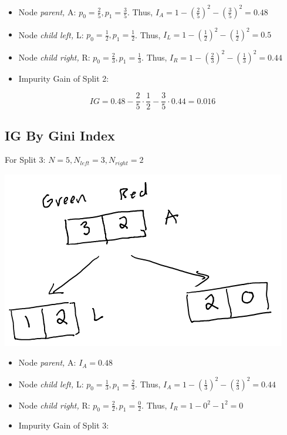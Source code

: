 \documentclass[
]{article}
\begin{document}
\begin{itemize}
\item
  Node \emph{parent,} A: \(p_0 = \frac{2}{5}, p_1 = \frac{3}{5}\). Thus,
  \(I_{A} = 1-(\frac{2}{5})^2- (\frac{3}{5})^2 = 0.48\)
\item
  Node \emph{child left,} L: \(p_0 = \frac{1}{2}, p_1 = \frac{1}{2}\).
  Thus, \(I_{L} = 1- (\frac{1}{2})^2-(\frac{1}{2})^2=0.5\)
\item
  Node \emph{child right,} R: \(p_0 = \frac{2}{3}, p_1 = \frac{1}{3}\).
  Thus, \(I_{R} = 1-(\frac{2}{3})^2 -(\frac{1}{3})^2 = 0.44\)
\item
  Impurity Gain of Split 2:
\end{itemize}

\[IG = 0.48 - \frac{2}{5} \cdot \frac{1}{2}-\frac{3}{5} \cdot 0.44 = 0.016\]

\hypertarget{ig-by-gini-index-2}{%
\subsection{IG By Gini Index}\label{ig-by-gini-index-2}}

For Split 3: \(N = 5, N_{left} =3, N_{right} = 2\)

\includegraphics{images/im2.png}

\begin{itemize}
\item
  Node \emph{parent,} A: \(I_{A} = 0.48\)
\item
  Node \emph{child left,} L: \(p_0 = \frac{1}{3}, p_1 = \frac{2}{3}\).
  Thus, \(I_{A} = 1-(\frac{1}{3})^2 -(\frac{2}{3})^2 = 0.44\)
\item
  Node \emph{child right,} R: \(p_0 = \frac{2}{2}, p_1 = \frac{0}{2}\).
  Thus, \(I_{R} = 1-0^2-1^2 = 0\)
\item
  Impurity Gain of Split 3:
\end{itemize}
\end{document}
